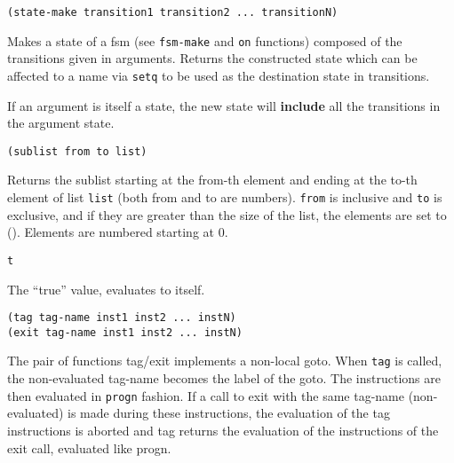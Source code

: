         
{\usagefont\begin{verbatim}
(state-make transition1 transition2 ... transitionN)
\end{verbatim}}\usageupspace

Makes a state of a fsm (see \verb"fsm-make" and \verb"on" functions) 
composed of the
transitions given in arguments. Returns the constructed state which can be
affected to a name via \verb"setq" to be used as the destination state in
transitions.

If an argument is itself a state, the new state will {\bf include} all the
transitions in the argument state.

        
{\usagefont\begin{verbatim}
(sublist from to list)
\end{verbatim}}\usageupspace

Returns the sublist starting at the from-th element and ending at the to-th
element of list \verb"list" (both from and to are numbers). \verb"from" is
inclusive and \verb"to" is exclusive, and if they are greater than the size
of the list, the elements are set to (). Elements are numbered starting at
0.


        
{\usagefont\begin{verbatim}
t
\end{verbatim}}\usageupspace

The ``true'' value, evaluates to itself.

        
{\usagefont\begin{verbatim}
(tag tag-name inst1 inst2 ... instN)
(exit tag-name inst1 inst2 ... instN)
\end{verbatim}}\usageupspace

The pair of functions tag/exit implements a non-local goto.  When \verb"tag"
is called, the non-evaluated tag-name becomes the label of the goto. The
instructions are then evaluated in \verb"progn" fashion. If a call to exit
with the same tag-name (non-evaluated) is made during these instructions, the
evaluation of the tag instructions is aborted and tag returns the
evaluation of the instructions of the exit call, evaluated like progn.

